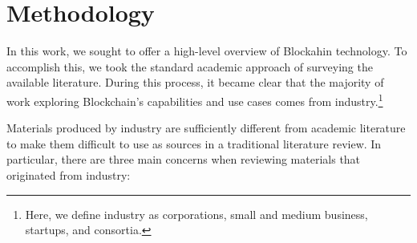 
\section{Methodology}
\label{sec:method}

In this work, we sought to offer a high-level overview of Blockahin technology.
To accomplish this, we took the standard academic approach of surveying the available literature.
During this process, it became clear that the majority of work exploring Blockchain's capabilities and use cases comes from industry.\footnote{Here, we define industry as corporations, small and medium business, startups, and consortia.}

Materials produced by industry are sufficiently different from academic literature to make them difficult to use as sources in a traditional literature review.
In particular, there are three main concerns when reviewing materials that originated from industry:

